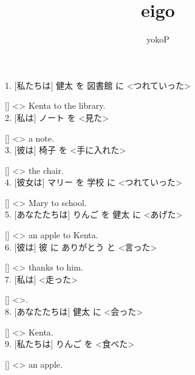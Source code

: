 \documentclass[uplatex,
paper=a4,
fontsize=18pt,
jafontsize=16pt,
number_of_lines=30,
line_length=30zh,
baselineskip=25pt,
]{jlreq}
\author{yokoP}
\title{eigo}
\begin{document}
1.  [私たちは] 健太 を 図書館 に <つれていった>

  [\hspace{3em}] <\hspace{3em}> Kenta to the library.
\\

2.  [私は] ノート を <見た>

  [\hspace{3em}] <\hspace{3em}> a note.
\\

3.  [彼は] 椅子 を <手に入れた>

  [\hspace{3em}] <\hspace{3em}> the chair.
\\

4.  [彼女は] マリー を 学校 に <つれていった>

  [\hspace{3em}] <\hspace{3em}> Mary to school.
\\

5.  [あなたたちは] りんご を 健太 に <あげた>

  [\hspace{3em}] <\hspace{3em}> an apple to Kenta.
\\

6.  [彼は] 彼 に ありがとう と <言った>

  [\hspace{3em}] <\hspace{3em}> thanks to him.
\\

7.  [私は] <走った>

  [\hspace{3em}] <\hspace{3em}>.
\\

8.  [あなたたちは] 健太 に <会った>

  [\hspace{3em}] <\hspace{3em}> Kenta.
\\

9.  [私たちは] りんご を <食べた>

  [\hspace{3em}] <\hspace{3em}> an apple.
\\
\end{document}
